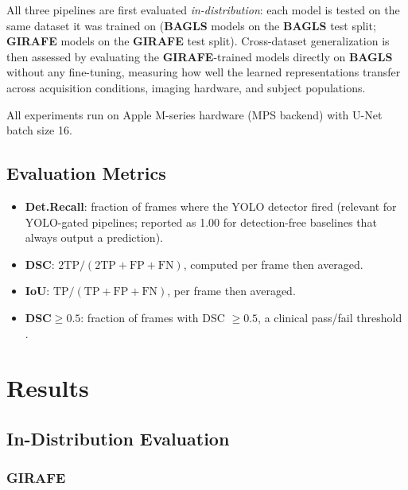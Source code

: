 \documentclass[preprint,12pt]{elsarticle}
\newcommand{\girafe}{\textbf{GIRAFE}}
\newcommand{\bagls}{\textbf{BAGLS}}
\begin{document}
All three pipelines are first evaluated \emph{in-distribution}: each model is
tested on the same dataset it was trained on (\bagls{} models on the \bagls{}
test split; \girafe{} models on the \girafe{} test split).
Cross-dataset generalization is then assessed by evaluating the
\girafe{}-trained models directly on \bagls{} without any fine-tuning,
measuring how well the learned representations transfer across acquisition
conditions, imaging hardware, and subject populations.

All experiments run on Apple M-series hardware (MPS backend) with U-Net batch size \num{16}.

\subsection{Evaluation Metrics}
\label{sec:metrics}

\begin{itemize}
  \item \textbf{Det.Recall}: fraction of frames where the YOLO detector fired
    (relevant for YOLO-gated pipelines; reported as \num{1.00} for detection-free
    baselines that always output a prediction).
  \item \textbf{DSC}: \(2\mathrm{TP}/(2\mathrm{TP}+\mathrm{FP}+\mathrm{FN})\),
    computed per frame then averaged.
  \item \textbf{IoU}: \(\mathrm{TP}/(\mathrm{TP}+\mathrm{FP}+\mathrm{FN})\),
    per frame then averaged.
  \item \textbf{DSC${\geq}0.5$}: fraction of frames with DSC $\geq 0.5$,
    a clinical pass/fail threshold \cite{andrade2025datainbrief}.
\end{itemize}

\section{Results}
\label{sec:results}

\subsection{In-Distribution Evaluation}
\label{sec:results_indist}

\subsubsection{GIRAFE}
\label{sec:results_girafe}
\end{document}
